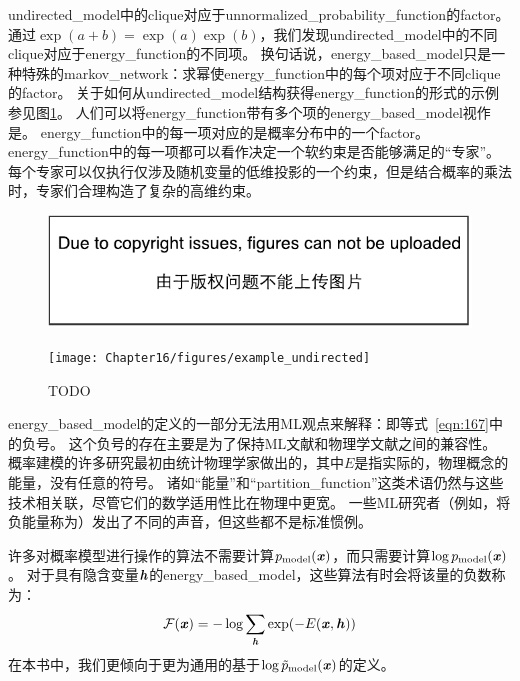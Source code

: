 \gls{undirected_model}中的\gls{clique}对应于\gls{unnormalized_probability_function}的\gls{factor}。 
通过$\exp(a+b) = \exp(a) \exp(b)$，我们发现\gls{undirected_model}中的不同\gls{clique}对应于\gls{energy_function}的不同项。
换句话说，\gls{energy_based_model}只是一种特殊的\gls{markov_network}：求幂使\gls{energy_function}中的每个项对应于不同\gls{clique}的\gls{factor}。
关于如何从\gls{undirected_model}结构获得\gls{energy_function}的形式的示例参见图\ref{fig:example_undirected_2}。
人们可以将\gls{energy_function}带有多个项的\gls{energy_based_model}视作是\citep{Hinton99}。
\gls{energy_function}中的每一项对应的是概率分布中的一个\gls{factor}。
\gls{energy_function}中的每一项都可以看作决定一个软约束是否能够满足的“专家”。
每个专家可以仅执行仅涉及随机变量的低维投影的一个约束，但是结合概率的乘法时，专家们合理构造了复杂的高维约束。
\begin{figure}[!htb]
\ifOpenSource
\centerline{\includegraphics{figure.pdf}}
\else
	\centerline{\texttt{[image: Chapter16/figures/example\_undirected]}}
\fi
	\caption{TODO}
	\label{fig:example_undirected_2}
\end{figure}



\gls{energy_based_model}的定义的一部分无法用\gls{ML}观点来解释：即等式~\eqref{eqn:167}中的负号。
这个负号的存在主要是为了保持\gls{ML}文献和物理学文献之间的兼容性。
概率建模的许多研究最初由统计物理学家做出的，其中$E$是指实际的，物理概念的能量，没有任意的符号。
诸如“能量”和“\gls{partition_function}”这类术语仍然与这些技术相关联，尽管它们的数学适用性比在物理中更宽。
一些\gls{ML}研究者（例如，\citep{Smolensky86}将负能量称为）发出了不同的声音，但这些都不是标准惯例。


许多对概率模型进行操作的算法不需要计算$p_{\text{model}}(\boldsymbol{\mathit{x}})$，而只需要计算$\log p_{\text{model}}(\boldsymbol{\mathit{x}})$。
对于具有隐含变量$\boldsymbol{\mathit{h}}$的\gls{energy_based_model}，这些算法有时会将该量的负数称为：
\begin{align}
\label{eqn:168}
\mathcal{F} (\boldsymbol{\mathit{x}}) = -\log \sum_{\boldsymbol{\mathit{h}}} \exp(-E(\boldsymbol{\mathit{x}},\boldsymbol{\mathit{h}}))
\end{align}
在本书中，我们更倾向于更为通用的基于$\log \tilde{p}_{\text{model}}(\boldsymbol{\mathit{x}})$的定义。


